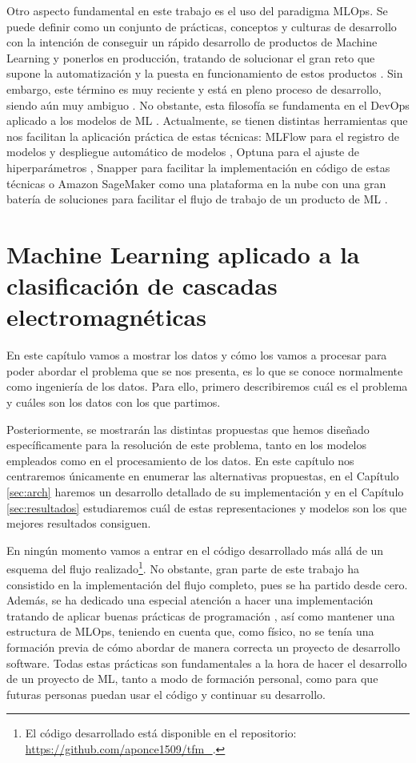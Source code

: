 \documentclass[a4paper,12pt,oneside,titlepage]{book}
\begin{document}
Otro aspecto fundamental en este trabajo es el uso del paradigma MLOps. Se puede definir como un conjunto de prácticas, conceptos y culturas de desarrollo con la intención de conseguir un rápido desarrollo de productos de Machine Learning y ponerlos en producción, tratando de solucionar el gran reto que supone la automatización y la puesta en funcionamiento de estos productos \cite{mlops_1}. Sin embargo, este término es muy reciente y está en pleno proceso de desarrollo, siendo aún muy ambiguo \cite{mlops_1}. No obstante, esta filosofía se fundamenta en el DevOps \cite{devops_1} aplicado a los modelos de  ML \cite{mlops_1}. Actualmente, se tienen distintas herramientas que nos facilitan la aplicación práctica de estas técnicas: MLFlow para el registro de modelos y despliegue automático de modelos \cite{mlflow}, Optuna para el ajuste de hiperparámetros \cite{optuna}, Snapper para facilitar la implementación en código de estas técnicas \cite{snapper, alb_3} o Amazon SageMaker como una plataforma en la nube con una gran batería de soluciones para facilitar el flujo de trabajo de un producto de ML \cite{sage}.

\chapter{Machine Learning aplicado a la clasificación de cascadas electromagnéticas}
\label{cap:3}

En este capítulo vamos a mostrar los datos y cómo los vamos a procesar para poder abordar el problema que se nos presenta, es lo que se conoce normalmente como ingeniería de los datos. Para ello, primero describiremos cuál es el problema y cuáles son los datos con los que partimos. 

Posteriormente, se mostrarán las distintas propuestas que hemos diseñado específicamente para la resolución de este problema, tanto en los modelos empleados como en el procesamiento de los datos. En este capítulo nos centraremos únicamente en enumerar las alternativas propuestas, en el Capítulo \ref{sec:arch} haremos un desarrollo detallado de su implementación y en el Capítulo \ref{sec:resultados} estudiaremos cuál de estas representaciones y modelos son los que mejores resultados consiguen.

En ningún momento vamos a entrar en el código desarrollado más allá de un esquema del flujo realizado\footnote{El código desarrollado está disponible en el repositorio: \url{https://github.com/aponce1509/tfm_}.}. No obstante, gran parte de este trabajo ha consistido en la implementación del flujo completo, pues se ha partido desde cero. Además, se ha dedicado una especial atención a hacer una implementación tratando de aplicar buenas prácticas de programación \cite{clean}, así como mantener una estructura de MLOps, teniendo en cuenta que, como físico, no se tenía una formación previa de cómo abordar de manera correcta un proyecto de desarrollo software. Todas estas prácticas son fundamentales a la hora de hacer el desarrollo de un proyecto de ML, tanto a modo de formación personal, como para que futuras personas puedan usar el código y continuar su desarrollo.
\end{document}
